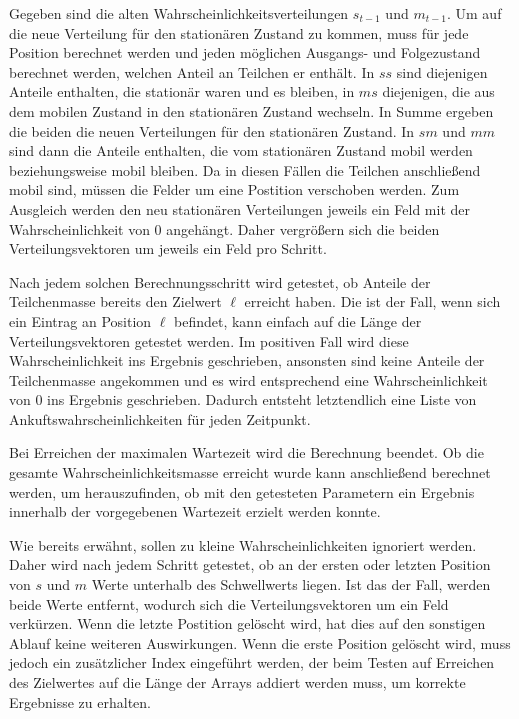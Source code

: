 Gegeben sind die alten Wahrscheinlichkeitsverteilungen $s_{t-1}$ und $m_{t-1}$.
Um auf die neue Verteilung für den stationären Zustand zu kommen, muss für jede Position berechnet werden und jeden möglichen Ausgangs- und Folgezustand berechnet werden, welchen Anteil an Teilchen er enthält. 
In $ss$ sind diejenigen Anteile enthalten, die stationär waren und es bleiben, in $ms$ diejenigen, die aus dem mobilen Zustand in den stationären Zustand wechseln. In Summe ergeben die beiden die neuen Verteilungen für den stationären Zustand.
In $sm$ und $mm$ sind dann die Anteile enthalten, die vom stationären Zustand mobil werden beziehungsweise mobil bleiben. Da in diesen Fällen die Teilchen anschließend mobil sind, müssen die Felder um eine Postition verschoben werden. Zum Ausgleich werden den neu stationären Verteilungen jeweils ein Feld mit der Wahrscheinlichkeit von $0$ angehängt.
Daher vergrößern sich die beiden Verteilungsvektoren um jeweils ein Feld pro Schritt.

Nach jedem solchen Berechnungsschritt wird getestet, ob Anteile der Teilchenmasse bereits den Zielwert $\ell$ erreicht haben. Die ist der Fall, wenn sich ein Eintrag an Position $\ell$ befindet, kann einfach auf die Länge der Verteilungsvektoren getestet werden. Im positiven Fall wird diese Wahrscheinlichkeit ins Ergebnis geschrieben, ansonsten sind keine Anteile der Teilchenmasse angekommen und es wird entsprechend eine Wahrscheinlichkeit von $0$ ins Ergebnis geschrieben.
Dadurch entsteht letztendlich eine Liste von Ankuftswahrscheinlichkeiten für jeden Zeitpunkt.

Bei Erreichen der maximalen Wartezeit wird die Berechnung beendet. Ob die gesamte Wahrscheinlichkeitsmasse erreicht wurde kann anschließend berechnet werden, um herauszufinden, ob mit den getesteten Parametern ein Ergebnis innerhalb der vorgegebenen Wartezeit erzielt werden konnte. 

Wie bereits erwähnt, sollen zu kleine Wahrscheinlichkeiten ignoriert werden. Daher wird nach jedem Schritt getestet, ob an der ersten oder letzten Position von $s$ und $m$ Werte unterhalb des Schwellwerts liegen. Ist das der Fall, werden beide Werte entfernt, wodurch sich die Verteilungsvektoren um ein Feld verkürzen. Wenn die letzte Postition gelöscht wird, hat dies auf den sonstigen Ablauf keine weiteren Auswirkungen. Wenn die erste Position gelöscht wird, muss jedoch ein zusätzlicher Index eingeführt werden, der beim Testen auf Erreichen des Zielwertes auf die Länge der Arrays addiert werden muss, um korrekte Ergebnisse zu erhalten.
% 
% 

